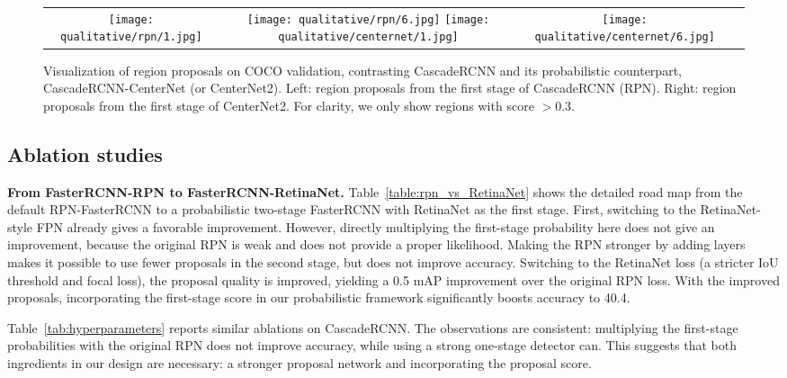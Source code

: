 \documentclass{article}
\renewcommand{\paragraph}[1]{\noindent\textbf{#1}}
\begin{document}
{
\begin{figure*}[t]
\centering
     \begin{tabular}{c@{}c@{}c@{}c}
      \texttt{[image: qualitative/rpn/1.jpg]}
      &\texttt{[image: qualitative/rpn/6.jpg]}
      \texttt{[image: qualitative/centernet/1.jpg]}
      &\texttt{[image: qualitative/centernet/6.jpg]}
      \end{tabular}
      \vspace{-3mm}
      \caption{Visualization of region proposals on COCO validation, contrasting CascadeRCNN and its probabilistic counterpart, CascadeRCNN-CenterNet (or CenterNet2). Left: region proposals from the first stage of CascadeRCNN (RPN). Right: region proposals from the first stage of CenterNet2. For clarity, we only show regions with score $>$0.3. }
      \label{fig:demo}
      \vspace{-2mm}
\end{figure*}
}

\subsection{Ablation studies}
\label{sec:ablation}
\paragraph{From FasterRCNN-RPN to FasterRCNN-RetinaNet.}
Table~\ref{table:rpn_vs_RetinaNet} shows the detailed road map from the default RPN-FasterRCNN to a probabilistic two-stage FasterRCNN with RetinaNet as the first stage.
First, switching to the RetinaNet-style FPN already gives a favorable improvement.
However, directly multiplying the first-stage probability here does not give an improvement, because the original RPN is weak and does not provide a proper likelihood.
Making the RPN stronger by adding layers makes it possible to use fewer proposals in the second stage, but does not improve accuracy.
Switching to the RetinaNet loss (a stricter IoU threshold and focal loss), the proposal quality is improved, yielding a 0.5 mAP improvement over the original RPN loss.
With the improved proposals, incorporating the first-stage score in our probabilistic framework significantly boosts accuracy to 40.4. 

Table~\ref{tab:hyperparameters} reports similar ablations on CascadeRCNN.
The observations are consistent: multiplying the first-stage probabilities with the original RPN does not improve accuracy, while using a strong one-stage detector can.
This suggests that both ingredients in our design are necessary: a stronger proposal network and incorporating the proposal score.
\end{document}
